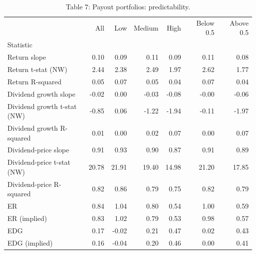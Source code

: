 \begin{table}
\caption{Table 7: Payout portfolios: predictability.}
\label{tab:replication_7}
\begin{tabular}{lrrrrrr}
\toprule
 & All & Low & Medium & High & Below 0.5 & Above 0.5 \\
Statistic &  &  &  &  &  &  \\
\midrule
Return slope & 0.10 & 0.09 & 0.11 & 0.09 & 0.11 & 0.08 \\
Return t-stat (NW) & 2.44 & 2.38 & 2.49 & 1.97 & 2.62 & 1.77 \\
Return R-squared & 0.05 & 0.07 & 0.05 & 0.04 & 0.07 & 0.04 \\
Dividend growth slope & -0.02 & 0.00 & -0.03 & -0.08 & -0.00 & -0.06 \\
Dividend growth t-stat (NW) & -0.85 & 0.06 & -1.22 & -1.94 & -0.11 & -1.97 \\
Dividend growth R-squared & 0.01 & 0.00 & 0.02 & 0.07 & 0.00 & 0.07 \\
Dividend-price slope & 0.91 & 0.93 & 0.90 & 0.87 & 0.91 & 0.89 \\
Dividend-price t-stat (NW) & 20.78 & 21.91 & 19.40 & 14.98 & 21.20 & 17.85 \\
Dividend-price R-squared & 0.82 & 0.86 & 0.79 & 0.75 & 0.82 & 0.79 \\
ER & 0.84 & 1.04 & 0.80 & 0.54 & 1.00 & 0.59 \\
ER (implied) & 0.83 & 1.02 & 0.79 & 0.53 & 0.98 & 0.57 \\
EDG & 0.17 & -0.02 & 0.21 & 0.47 & 0.02 & 0.43 \\
EDG (implied) & 0.16 & -0.04 & 0.20 & 0.46 & 0.00 & 0.41 \\
\bottomrule
\end{tabular}
\end{table}
